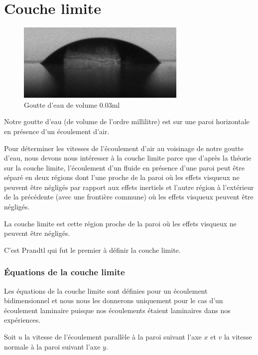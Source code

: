 \chapter{Couche limite}\label{ch:couche}

\begin{figure}[ht]
	\centering
	\includegraphics[scale = 0.6]{./gfx/crop_vitesse=28_volume=003.png}
	\caption{Goutte d'eau de volume $0.03$ml}
\end{figure}
Notre goutte d'eau (de volume de l'ordre millilitre) est sur une paroi horizontale en présence d'un écoulement d'air.


Pour déterminer les vitesses de l'écoulement d'air au voisinage de notre goutte d'eau, nous devons nous intéresser à la couche limite parce que d'après la théorie sur la couche limite, l'écoulement d'un fluide en présence d'une paroi peut être séparé en deux régions dont l'une proche de la paroi où les effets visqueux ne peuvent être négligés par rapport aux effets inertiels et l'autre région à l'extérieur de la précédente (avec une frontière commune) où les effets visqueux peuvent être négligés.

La couche limite est cette région proche de la paroi où les effets visqueux ne peuvent être négligés.

C'est Prandtl qui fut le premier à définir la couche limite. 

\subsection{Équations de la couche limite }

Les équations de la couche limite sont définies pour un écoulement bidimensionnel et nous nous les donnerons uniquement pour le cas d'un écoulement laminaire puisque nos écoulements étaient laminaires dans nos expériences.

Soit $u$ la vitesse de l'écoulement parallèle à la paroi suivant l'axe $x$ et $v$ la vitesse normale à la paroi suivant l'axe $y$.

